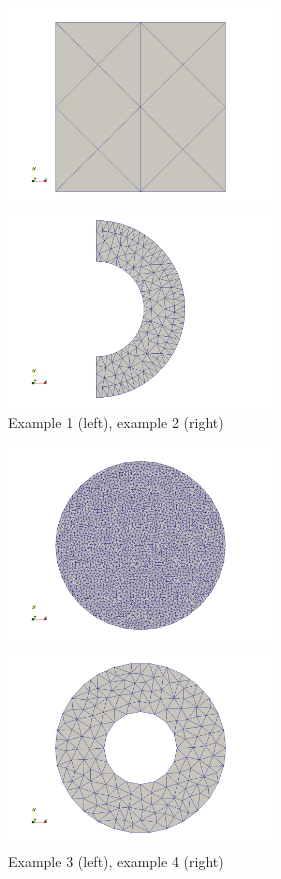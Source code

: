 \begin{center}
\includegraphics[width=7cm]{python_codes/fieldstone_131/example1/example1}
\includegraphics[width=7cm]{python_codes/fieldstone_131/example2/example2}\\
{\captionfont Example 1 (left), example 2 (right)}
\end{center}


\begin{center}
\includegraphics[width=7cm]{python_codes/fieldstone_131/example3/example3}
\includegraphics[width=7cm]{python_codes/fieldstone_131/example4/example4}\\
{\captionfont Example 3 (left), example 4 (right)}
\end{center}


